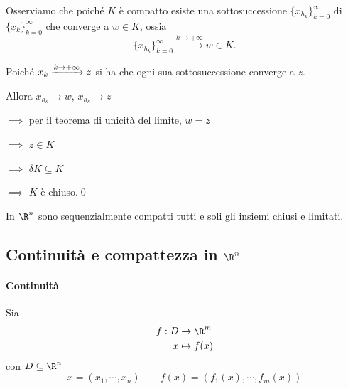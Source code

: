 {\begin{itemize}
\begin{enumerate}
                Osserviamo che poiché $ K $ è compatto esiste una sottosuccessione $ \{x_{h_{k} } \}_{k=0}^\infty $ di $ \{x_{k} \}_{k=0}^\infty $ che converge a $ w \in K $, ossia \[\{x_{h_{k} } \}_{k=0}^\infty \xrightarrow{k\to +\infty} w \in K\displaystyle.\]

                Poiché $ x_{k} \xrightarrow{k\to +\infty} z \displaystyle $ si ha che ogni sua sottosuccessione converge a $ z $.

                Allora $ x_{h_{k}} \to w  $, $ x_{h_{k} } \to z  $ 
                
                $\implies$ per il teorema di unicità del limite, $ w=z $ 
                
                $\implies$ $ z \in K $ 
                
                $\implies$ $ \delta K \subseteq K $ 
                
                $\implies$ $ K $ è chiuso.\qed
            \end{enumerate}
    \end{itemize}
}

In $ \R^{n} $ sono sequenzialmente compatti tutti e soli gli insiemi chiusi e limitati.

\subsection{Continuità e compattezza in $ \R^{n} $}

\paragraph{Continuità}
Sia
\begin{align*}
f:D & \to \R^{m} \\
x & \mapsto f(x)
\end{align*} con $ D \subseteq \R^{n}$ \[
    x=(x_1, \cdots, x_{n} )\qquad f(x)=(f_1(x), \cdots, f_{m}(x) )
\]

